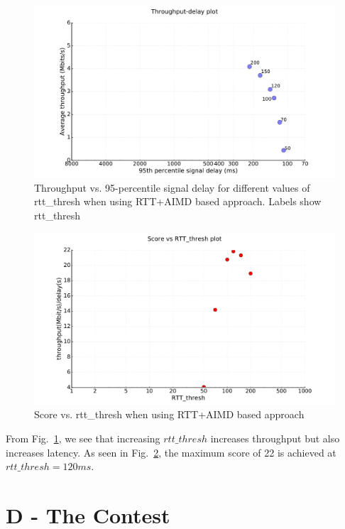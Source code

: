 \documentclass{article}
\begin{document}
\begin{figure}[h]
\includegraphics[width=\columnwidth]{"../C/aimd/aimdrtt"}
\caption{Throughput vs. 95-percentile signal delay for different
values of rtt\_thresh when using RTT+AIMD based approach. Labels
show rtt\_thresh}
\label{aimdrtt}
\end{figure}

\begin{figure}[h]
\includegraphics[width=\columnwidth]{"../C/aimd/aimdrtt-score"}
\caption{Score vs. rtt\_thresh when using RTT+AIMD based approach}
\label{aimdrtt-score}
\end{figure}

From Fig.~\ref{aimdrtt}, we see that increasing $rtt\_thresh$
increases throughput but also increases latency. As seen in
Fig.~\ref{aimdrtt-score}, the maximum score of 22 is achieved at
$rtt\_thresh = 120ms$.

\clearpage
\section{D - The Contest}
\end{document}
